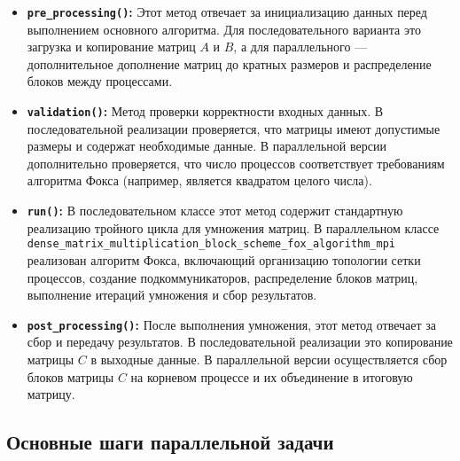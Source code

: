 \documentclass{report}
\begin{document}
\begin{itemize}
    \item \textbf{\texttt{pre\_processing()}:} Этот метод отвечает за инициализацию данных перед выполнением основного алгоритма. Для последовательного варианта это загрузка и копирование матриц $A$ и $B$, а для параллельного — дополнительное дополнение матриц до кратных размеров и распределение блоков между процессами.
    
    \item \textbf{\texttt{validation()}:} Метод проверки корректности входных данных. В последовательной реализации проверяется, что матрицы имеют допустимые размеры и содержат необходимые данные. В параллельной версии дополнительно проверяется, что число процессов соответствует требованиям алгоритма Фокса (например, является квадратом целого числа).
    
    \item \textbf{\texttt{run()}:} В последовательном классе этот метод содержит стандартную реализацию тройного цикла для умножения матриц. В параллельном классе \texttt{dense\_matrix\_multiplication\_block\_scheme\_fox\_algorithm\_mpi} реализован алгоритм Фокса, включающий организацию топологии сетки процессов, создание подкоммуникаторов, распределение блоков матриц, выполнение итераций умножения и сбор результатов.
    
    \item \textbf{\texttt{post\_processing()}:} После выполнения умножения, этот метод отвечает за сбор и передачу результатов. В последовательной реализации это копирование матрицы $C$ в выходные данные. В параллельной версии осуществляется сбор блоков матрицы $C$ на корневом процессе и их объединение в итоговую матрицу.
\end{itemize}

\subsection*{Основные шаги параллельной задачи}
\end{document}
